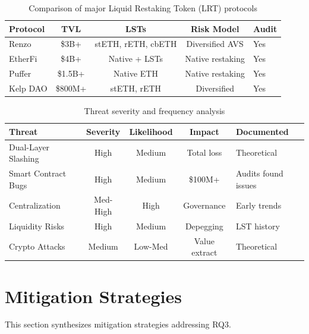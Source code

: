 \documentclass[runningheads]{llncs}
\begin{document}
\begin{table}[!ht]
    \centering
    \scriptsize
    \caption{Comparison of major Liquid Restaking Token (LRT) protocols}
    \label{tab:lrt_comparison}
    \begin{tabular}{lcccp{2.5cm}}
        \toprule
        \textbf{Protocol} & \textbf{TVL} & \textbf{LSTs} & \textbf{Risk Model} & \textbf{Audit} \\
        \midrule
        Renzo & \$3B+ & stETH, rETH, cbETH & Diversified AVS & Yes \\
        EtherFi & \$4B+ & Native + LSTs & Native restaking & Yes \\
        Puffer & \$1.5B+ & Native ETH & Native restaking & Yes \\
        Kelp DAO & \$800M+ & stETH, rETH & Diversified & Yes \\
        \bottomrule
    \end{tabular}
\end{table}

\begin{table}[!ht]
    \centering
    \scriptsize
    \caption{Threat severity and frequency analysis}
    \label{tab:threat_severity}
    \begin{tabular}{lcccp{3cm}}
        \toprule
        \textbf{Threat} & \textbf{Severity} & \textbf{Likelihood} & \textbf{Impact} & \textbf{Documented} \\
        \midrule
        Dual-Layer Slashing & High & Medium & Total loss & Theoretical \\
        Smart Contract Bugs & High & Medium & \$100M+ & Audits found issues \\
        Centralization & Med-High & High & Governance & Early trends \\
        Liquidity Risks & High & Medium & Depegging & LST history \\
        Crypto Attacks & Medium & Low-Med & Value extract & Theoretical \\
        \bottomrule
    \end{tabular}
\end{table}

\vspace{-0.3cm}
\section{Mitigation Strategies}
\label{sec:mitigations}

This section synthesizes mitigation strategies addressing RQ3.
\end{document}
